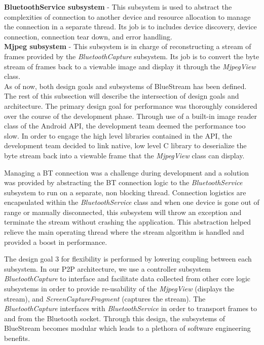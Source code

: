 \documentclass[a4paper,12pt]{article}
\begin{document}
\noindent \textbf{BluetoothService subsystem} - This subsystem is used to abstract the complexities of connection to another device and resource allocation to manage the connection in a separate thread. Its job is to includes device discovery, device connection, connection tear down, and error handling. \\

\noindent \textbf{Mjpeg subsystem} - This subsystem is in charge of reconstructing a stream of frames provided by the \textit{BluetoothCapture} subsystem. Its job is to convert the byte stream of frames back to a viewable image and display it through the \textit{MjpegView} class. \\


As of now, both design goals and subsystems of BlueStream has been defined. The rest of this subsection will describe the intersection of design goals and architecture. The primary design goal for performance was thoroughly considered over the course of the development phase. Through use of a built-in image reader class of the Android API, the development team deemed the performance too slow. In order to engage the high level libraries contained in the API, the development team decided to link native, low level C library to deserialize the byte stream back into a viewable frame that the \textit{MjpegView} class can display\cite{SimpleMjpegView}. 

Managing a BT connection was a challenge during development and a solution was provided by abstracting the BT connection logic to the \textit{BluetoothService} subsystem to run on a separate, non blocking thread. Connection logistics are encapsulated within the \textit{BluetoothService} class and when one device is gone out of range or manually disconnected, this subsystem will throw an exception and terminate the stream without crashing the application. This abstraction helped relieve the main operating thread where the stream algorithm is handled and provided a boost in performance.

The design goal 3 for flexibility is performed by lowering coupling between each subsystem. In our P2P architecture, we use a controller subsystem \textit{BluetoothCapture} to interface and facilitate data collected from other core logic subsystems in order to provide re-usability of the \textit{MjpegView} (displays the stream), and \textit{ScreenCaptureFragment} (captures the stream). The \textit{BluetoothCapture} interfaces with \textit{BluetoothService} in order to transport frames to and from the Bluetooth socket. Through this design, the subsystems of BlueStream becomes modular which leads to a plethora of software engineering benefits.
\end{document}
